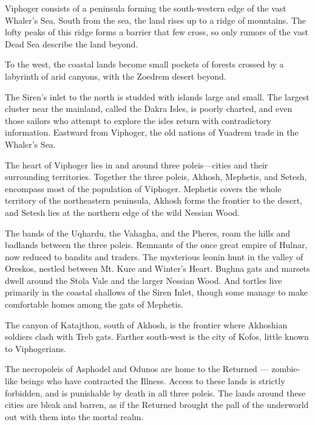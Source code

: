Viphoger consists of a peninsula forming the south-western edge of the vast Whaler's Sea.
South from the sea, the land rises up to a ridge of mountains.
The lofty peaks of this ridge forms a barrier that few cross, so only rumors of the vast Dead Sea describe the land beyond.

To the west, the coastal lands become small pockets of forests crossed by a labyrinth of arid canyons, with the Zoedrem desert beyond.

The Siren's inlet to the north is studded with islands large and small.
The largest cluster near the mainland, called the Dakra Isles, is poorly charted, and even those sailors who attempt to explore the isles return with contradictory information.
Eastward from Viphoger, the old nations of Yuadrem trade in the Whaler's Sea. %

The heart of Viphoger lies in and around three poleis—cities and their surrounding territories.
Together the three poleis, Akhosh, Mephetis, and Setesh, encompass most of the population of Viphoger.
Mephetis covers the whole territory of the northeastern peninsula, Akhosh forms the frontier to the desert, and Setesh lies at the northern edge of the wild Nessian Wood.

The bands of the Uqhardu, the Vahagha, and the Pheres, roam the hills and badlands between the three poleis.
Remnants of the once great empire of Hulnar, now reduced to bandits and traders.
The mysterious leonin hunt in the valley of Oreskos, nestled between Mt. Kure and Winter's Heart.
Bughna gats and marsets dwell around the Stola Vale and the larger Nessian Wood.
And tortles live primarily in the coastal shallows of the Siren Inlet, though some manage to make comfortable homes among the gats of Mephetis.

The canyon of Katajthon, south of Akhosh, is the frontier where Akhoshian soldiers clash with Treb gats.
Farther south-west is the city of Kofos, little known to Viphogerians.

The necropoleis of Asphodel and Odunos are home to the Returned --- zombie-like beings who have contracted the Illness.
Access to these lands is strictly forbidden, and is punishable by death in all three poleis.
The lands around these cities are bleak and barren, as if the Returned brought the pall of the underworld out with them into the mortal realm.




\newpage~
